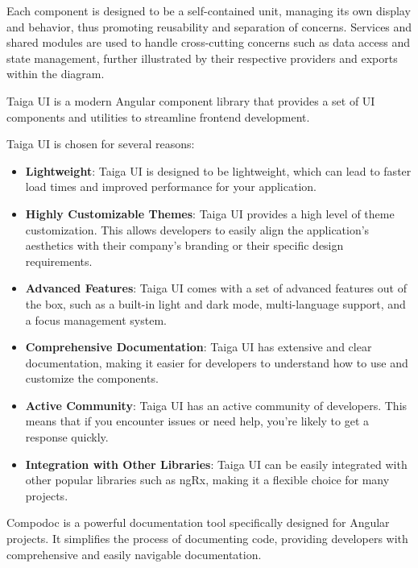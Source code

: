 Each component is designed to be a self-contained unit, managing its own display and behavior, thus promoting reusability and separation of concerns.
Services and shared modules are used to handle cross-cutting concerns such as data access and state management, further illustrated by their respective providers and exports within the diagram.


Taiga UI is a modern Angular component library that provides a set of UI components and utilities to streamline frontend development.

Taiga UI is chosen for several reasons:

\begin{itemize}
    \item \textbf{Lightweight}: Taiga UI is designed to be lightweight, which can lead to faster load times and improved performance for your application.
    \item \textbf{Highly Customizable Themes}: Taiga UI provides a high level of theme customization. This allows developers to easily align the application's aesthetics with their company's branding or their specific design requirements.
    \item \textbf{Advanced Features}: Taiga UI comes with a set of advanced features out of the box, such as a built-in light and dark mode, multi-language support, and a focus management system.
    \item \textbf{Comprehensive Documentation}: Taiga UI has extensive and clear documentation, making it easier for developers to understand how to use and customize the components.
    \item \textbf{Active Community}: Taiga UI has an active community of developers. This means that if you encounter issues or need help, you're likely to get a response quickly.
    \item \textbf{Integration with Other Libraries}: Taiga UI can be easily integrated with other popular libraries such as ngRx, making it a flexible choice for many projects.
\end{itemize}


Compodoc is a powerful documentation tool specifically designed for Angular projects. It simplifies the process of documenting code, providing developers with comprehensive and easily navigable documentation.

